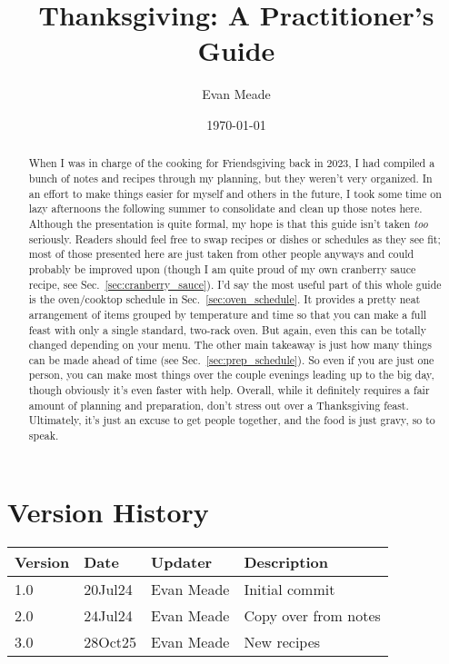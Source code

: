 \documentclass[12pt]{article}
\title{Thanksgiving: A Practitioner's Guide}
\author{Evan Meade}
\date{\today}
\begin{document}
	\fancyfoot[R]{\thepage}
	
	\maketitle
	
	\begin{abstract}
		When I was in charge of the cooking for Friendsgiving back in 2023, I had compiled a bunch of notes and recipes through my planning, but they weren't very organized. In an effort to make things easier for myself and others in the future, I took some time on lazy afternoons the following summer to consolidate and clean up those notes here. Although the presentation is quite formal, my hope is that this guide isn't taken \textit{too} seriously. Readers should feel free to swap recipes or dishes or schedules as they see fit; most of those presented here are just taken from other people anyways and could probably be improved upon (though I am quite proud of my own cranberry sauce recipe, see Sec.~\ref{sec:cranberry_sauce}). I'd say the most useful part of this whole guide is the oven/cooktop schedule in Sec.~\ref{sec:oven_schedule}. It provides a pretty neat arrangement of items grouped by temperature and time so that you can make a full feast with only a single standard, two-rack oven. But again, even this can be totally changed depending on your menu. The other main takeaway is just how many things can be made ahead of time (see Sec.~\ref{sec:prep_schedule}). So even if you are just one person, you can make most things over the couple evenings leading up to the big day, though obviously it's even faster with help. Overall, while it definitely requires a fair amount of planning and preparation, don't stress out over a Thanksgiving feast. Ultimately, it's just an excuse to get people together, and the food is just gravy, so to speak.
	\end{abstract}
	
	\newpage
	
	\section*{Version History}
	\begin{tabular}{|l|l|l|l|}
		\hline
		\textbf{Version} & \textbf{Date} & \textbf{Updater} & \textbf{Description} \\\hline
		1.0 & 20Jul24 & Evan Meade & Initial commit \\\hline
		2.0 & 24Jul24 & Evan Meade & Copy over from notes \\\hline
		3.0 & 28Oct25 & Evan Meade & New recipes \\\hline
	\end{tabular}
	
\end{document}
